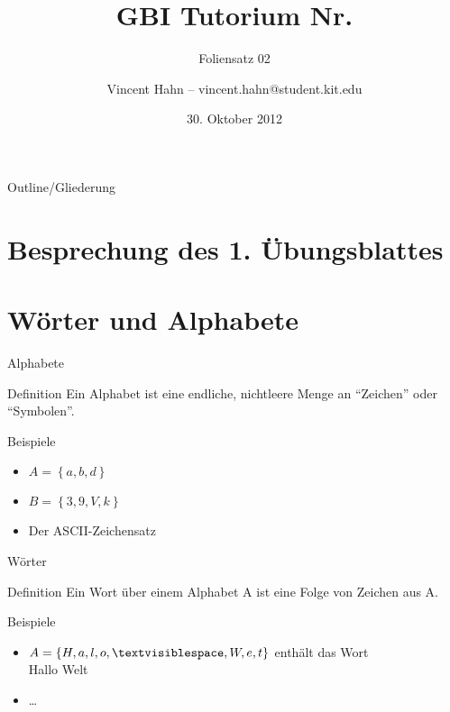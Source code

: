 \documentclass[18pt]{beamer}
\title[GBI Tutorium]{GBI Tutorium Nr. }
\subtitle{Foliensatz 02}
\date{30. Oktober 2012}
\author{Vincent Hahn -- vincent.hahn@student.kit.edu}
\institute{Institut für theoretische Informatik}
\begin{document}

\begin{frame}
    \titlepage
\end{frame}

\begin{frame}{Outline/Gliederung}
    \tableofcontents
\end{frame}

\section{Besprechung des 1. Übungsblattes}

\section{Wörter und Alphabete}
\begin{frame}{Alphabete}
    \begin{block}{Definition}
        Ein Alphabet ist eine endliche, nichtleere Menge an "`Zeichen"' oder "`Symbolen"'.
    \end{block}
    \begin{exampleblock}{Beispiele}
        \begin{itemize}
            \item $A = \left\{a, b, d\right\}$
            \item $B = \left\{3, 9, V, k\right\} $
            \item Der ASCII-Zeichensatz
        \end{itemize}
    \end{exampleblock}
\end{frame}

\begin{frame}{Wörter}
    \begin{block}{Definition}
        Ein Wort über einem Alphabet A ist eine Folge von Zeichen aus A.
    \end{block}
    \begin{exampleblock}{Beispiele}
        \begin{itemize}
            \item $A = \left\{H, a, l, o, \textvisiblespace, W, e, t\right\}$  enthält das Wort\\
            Hallo Welt
            \item \dots
        \end{itemize}
    \end{exampleblock}
\end{frame}
\end{document}
